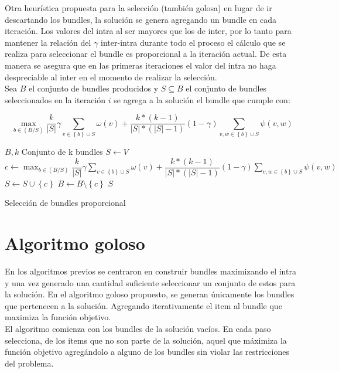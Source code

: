 Otra heurística propuesta para la selección (también golosa) en lugar de ir descartando los bundles, la solución se genera agregando un bundle en cada iteración. Los valores del intra al ser mayores que los de inter, por lo tanto para mantener la relación del $\gamma$ inter-intra durante todo el proceso el cálculo que se realiza para seleccionar el bundle es proporcional a la iteración actual. De esta manera se asegura que en las primeras iteraciones el valor del intra no haga despreciable al inter en el momento de realizar la selección.\\
Sea $B$ el conjunto de bundles producidos y $S \subseteq B$ el conjunto de bundles seleccionados en la iteración $i$ se agrega a la solución el bundle que cumple con:

\begin{equation}
\max_{b \in (B/S)}{\dfrac{k}{|S|}} \gamma \sum_{v \in \left\{b\right\} \cup S}{\omega(v)} + \dfrac{k * (k-1)}{|S| * (|S|-1)} (1-\gamma) \sum_{v,w \in \left\{b\right\} \cup S}{\psi(v,w)}
\end{equation}

\begin{algorithm}[H]
\begin{algorithmic}[1]
\REQUIRE $B, k$
\ENSURE Conjunto de k bundles
\STATE $S \leftarrow V$
\STATE $c \leftarrow \max_{b \in (B/S)}{\dfrac{k}{|S|}} \gamma \sum_{v \in \left\{b\right\} \cup S}{\omega(v)} + \dfrac{k * (k-1)}{|S| * (|S|-1)} (1-\gamma) \sum_{v,w \in \left\{b\right\} \cup S}{\psi(v,w)}$
\STATE $S \leftarrow S \cup \left\{c\right\}$
\STATE $B \leftarrow B \setminus \left\{c\right\}$
\ENDWHILE
\RETURN $S$
\end{algorithmic}
\caption{Selección de bundles proporcional}\label{alg:algSelProp}
\end{algorithm}

\section{Algoritmo goloso}
En los algoritmos previos se centraron en construir bundles maximizando el intra y una vez generado una cantidad suficiente seleccionar un conjunto de estos para la solución. En el algoritmo goloso propuesto, se generan únicamente los bundles que pertenecen a la solución. Agregando iterativamente el item al bundle que maximiza la función objetivo.\\
El algoritmo comienza con los bundles de la solución vacíos. En cada paso selecciona, de los items que no son parte de la solución, aquel que máximiza la función objetivo agregándolo a alguno de los bundles sin violar las restricciones del problema.

